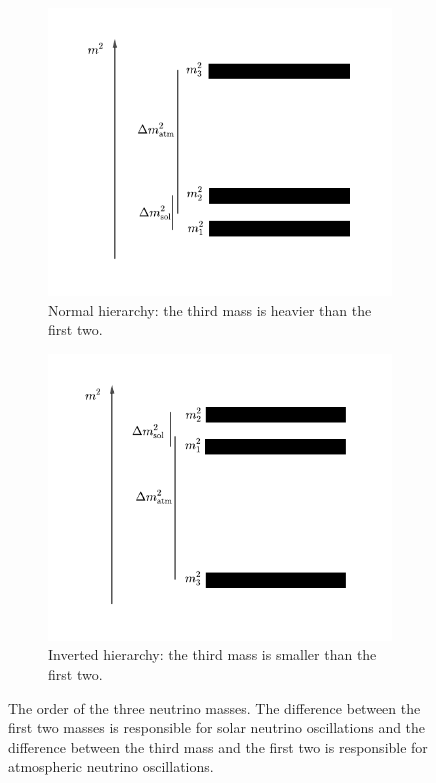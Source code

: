 \begin{figure}
	\centering
	\begin{subfigure}[t]{0.48\textwidth}
		\centering
		\includegraphics[width=\textwidth]{chapters/assets/basics/masses-nh}
		\caption{Normal hierarchy: the third mass is heavier than the first two.}
    \label{chap:basics-sec:flavor-isospin-pic-fig:masses-nh}
	\end{subfigure}
	\quad
	\begin{subfigure}[t]{0.48\textwidth}
		\centering
		\includegraphics[width=\textwidth]{chapters/assets/basics/masses-ih}
		\caption{Inverted hierarchy: the third mass is smaller than the first two.}
    \label{chap:basics-sec:flavor-isospin-pic-fig:masses-ih}
	\end{subfigure}
	\caption{The order of the three neutrino masses. The difference between the first two masses is responsible for solar neutrino oscillations and the difference between the third mass and the first two is responsible for atmospheric neutrino oscillations.}
    \label{chap:basics-sec:flavor-isospin-pic-fig:masses}
\end{figure}

